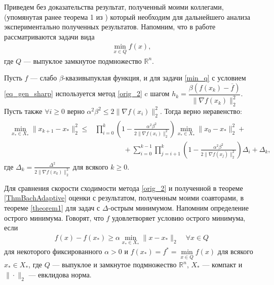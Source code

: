     Приведем без доказательства результат, полученный моими коллегами, (упомянутая ранее теорема 1 из \cite{sharp22}) который необходим для дальнейшего анализа экспериментально полученных результатов. Напомним, что в работе рассматриваются задачи вида
    \begin{gather}\label{min_q}
        \min_{x\in Q} f(x),
    \end{gather}
    где $Q$ --- выпуклое замкнутое подмножество $\mathbb{R}^{n}$. 
    \begin{theorem}\label{theorem1}
        Пусть $f$ --- слабо $\beta$-квазивыпуклая функция, и для задачи \eqref{min_q} с условием \eqref{eq_gen_sharp} используется метод \eqref{orig_2} c шагом
        $h_k = \dfrac{\beta(f(x_k) - \overline{f})}{\| \nabla f(x_k) \|_2^2}$. Пусть также $\forall i \geq 0$ верно $\alpha^2 \beta^2 \leq 2 \| \nabla f(x_i) \|_2^2$. Тогда верно неравенство:
        \begin{gather}\label{adaptive_estimate}
            \begin{aligned}
            \min_{x_* \in X_*} \|x_{k+1} - x_* \|_2^2 \leq &  \prod_{i=0}^k \left ( 1 - \frac{\alpha^2\beta^2}{2 \| \nabla f(x_i) \|_2^2} \right ) \min_{x_* \in X_*} \|x_0 - x_* \|_2^2 + \\& 
            \qquad \qquad + \sum_{i=0}^{k-1} \prod_{j=i+1}^k \left ( 1 - \frac{\alpha^2\beta^2}{2 \| \nabla f(x_j) \|_2^2} \right )\Delta_i + \Delta_k,
            \end{aligned}
        \end{gather}
        где $\Delta_k = \frac{\Delta^2}{2 \| \nabla f(x_k) \|_2^2}$ для всякого $k \geqslant 0$.
    \end{theorem}

    Для сравнения скорости сходимости метода \eqref{orig_2} и полученной в теореме \ref{ThmBachAdaptive} оценки с результатом, полученным моими соавторами, в теореме \ref{theorem1} для задач с $\Delta$-острым минимумом. Напомним определение острого минимума. Говорят, что $f$ удовлетворяет условию острого минимума, если
    \begin{gather}\label{sm}
        f(x) - f(x_*) \geq \alpha \min_{x_* \in X_*} \|x- x_*\|_2 \quad \forall x \in Q
    \end{gather}
    для некоторого фиксированного $\alpha >0$ и $f(x_*) = f^* = \min\limits_{x\in Q} f(x)$ для всякого $x_* \in X_*$, где $Q$ --- выпуклое и замкнутое подмножество $\mathbb{R}^n$, $X_*$ --- компакт и $\|\cdot\|_2$ --- евклидова норма. 
    
